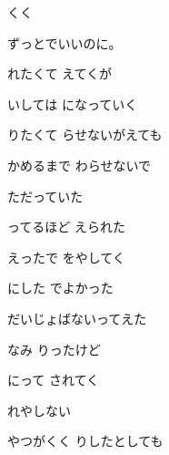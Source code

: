 \documentclass[a4paper,tate,twocolumn,12pt]{ltjtarticle}
\begin{document}
\thispagestyle{empty}

\begin{center}
{\LARGE {}くく}

{\large ずっとでいいのに。}
\end{center}

\vspace{1em}

\begin{flushleft}

\noindent\begin{minipage}{\linewidth}
れたくて えてくが

いしては になっていく

りたくて らせないがえても

かめるまで わらせないで
\end{minipage}

\vspace{2em}

\noindent\begin{minipage}{\linewidth}
ただっていた

ってるほど えられた

えったで をやしてく
\end{minipage}

\vspace{2em}

\noindent\begin{minipage}{\linewidth}
にした でよかった

だいじょばないってえた

なみ りったけど

にって されてく
\end{minipage}

\vspace{2em}

\noindent\begin{minipage}{\linewidth}
れやしない

やつがくく りしたとしても


\end{minipage}
\end{flushleft}
\end{document}
